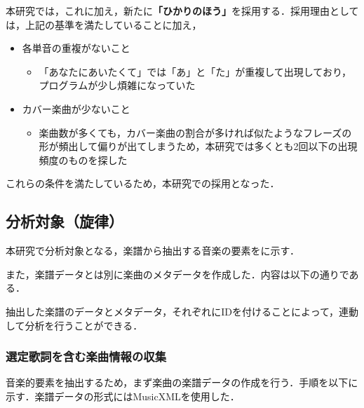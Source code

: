 本研究では，これに加え，新たに\textbf{「ひかりのほう」}を採用する．採用理由としては，上記の基準を満たしていることに加え，
\begin{itemize}
  \item 各単音の重複がないこと
        \begin{itemize}
          \item 「あなたにあいたくて」では「あ」と「た」が重複して出現しており，プログラムが少し煩雑になっていた
        \end{itemize}
  \item カバー楽曲が少ないこと
        \begin{itemize}
          \item 楽曲数が多くても，カバー楽曲の割合が多ければ似たようなフレーズの形が頻出して偏りが出てしまうため，本研究では多くとも2回以下の出現頻度のものを探した
        \end{itemize}
\end{itemize}
これらの条件を満たしているため，本研究での採用となった．

\subsection{分析対象（旋律）}\label{sec:3.1}
本研究で分析対象となる，楽譜から抽出する音楽の要素をに示す．




また，楽譜データとは別に楽曲のメタデータを作成した．内容は以下の通りである．\par
抽出した楽譜のデータとメタデータ，それぞれにIDを付けることによって，連動して分析を行うことができる．

\subsubsection{選定歌詞を含む楽曲情報の収集}\label{sec:3.2.2}
音楽的要素を抽出するため，まず楽曲の楽譜データの作成を行う．手順を以下に示す．楽譜データの形式にはMusicXML\cite{musicxml}を使用した．



